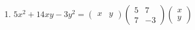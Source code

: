 \begin{frame}
\begin{enumerate}
	\vspace{5mm}
	\item $5x^2 + 14xy-3y^2 = \left(\begin{array}{cc} x &y \end{array}\right) \left(\begin{array}{rr}5&7\\[1mm]7&-3\end{array}\right) \left(\begin{array}{c}x\\[1mm] y\end{array}\right)$%
\end{enumerate}

\end{frame}



\subsection{}

